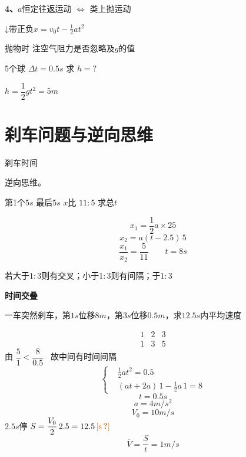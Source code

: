 \textbf{4、}$a$恒定往返运动 $\Leftrightarrow$ 类上抛运动

↓带正负\quad $x=v_0t-\frac12at^2$ %

抛物时 注空气阻力是否忽略及$g$的值 %

\begin{problem}
5个球 $\Delta t=0.5\unit{s}$ 求 $h=?$
\begin{solution}
$h=\dfrac12gt^2=5\unit{m}$
\end{solution}
\end{problem}


\section{刹车问题与逆向思维}
刹车时间

逆向思维。

\begin{problem}
第1个$5\unit{s}$ 最后$5\unit{s}$ \quad $x$比 $11:5$ \quad 求总$t$
\begin{solution}
\[ x_1=\frac{1}{2}a\times25 \]
\[ x_2=a(t-2.5)\,5 \] %
\[ \frac{x_1}{x_2}=\frac{5}{11} \qquad t=8\unit{s} \]
\end{solution}
\end{problem}
若大于$1:3$则有交叉；小于$1:3$则有间隔；于$1:3$

\textbf{时间交叠}
\begin{problem}
一车突然刹车，第$1\unit{s}$位移$8\unit{m}$，第$3\unit{s}$位移$0.5\unit{m}$，求$12.5\unit{s}$内平均速度
\begin{solution}
\[ \begin{array}{ccc} 1&2&3\\ 1&3&5 \end{array} \]
由 $\dfrac{5}{1}<\dfrac{8}{0.5}$ \ 故中间有时间间隔
\[ \left\{\begin{aligned} &\frac{1}{2}at^2=0.5\\ &(at+2a)\,1-\frac{1}{2}a\,1=8 \end{aligned}\right. \]
\[ t=0.5\unit{s} \]
\[ a=4\unit{m/s^2} \]
\[ V_0=10\unit{m/s} \]
$2.5\unit{s}$停 \quad $S=\dfrac{V_0}{2}\,2.5=12.5\,\text{\unclear{s}}$ %
\[ \overline{V}=\frac{S}{t}=1\unit{m/s} \]
\end{solution}
\end{problem}


